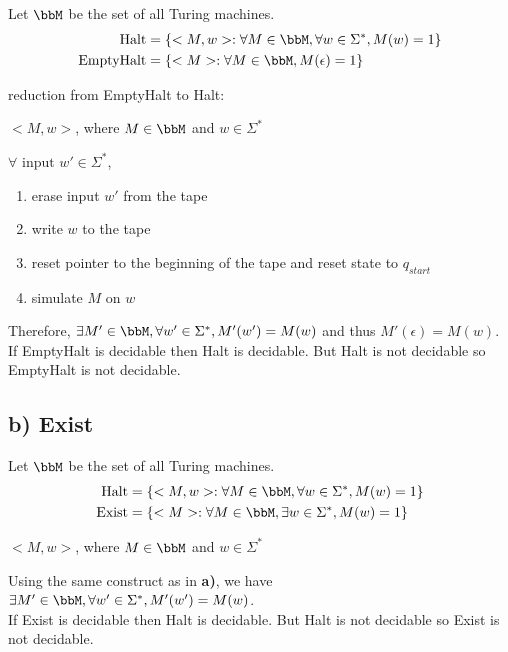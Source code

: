 \documentclass[twoside,11pt]{homework}
\begin{document}
\begin{solution}
  Let $\bbM$ be the set of all Turing machines. \\
  \[
    \begin{aligned}
      \text{Halt} &= \{ <M, w>: \forall M \in \bbM, \forall w \in \Sigma^*, M(w) = 1\}\\
      \text{EmptyHalt} &= \{ <M> : \forall M \in \bbM, M(\epsilon) = 1 \}
    \end{aligned}
  \]

  reduction from EmptyHalt to Halt:
  \begin{given}
    $<M ,w>$, where $M \in \bbM$ and $w \in \Sigma^*$
  \end{given}
  \begin{construct}
    $\forall \text{ input } w' \in \Sigma^*$,
    \begin{enumerate}
    \item erase input $w'$ from the tape
    \item write $w$ to the tape
    \item reset pointer to the beginning of the tape and reset state to $q_{start}$
    \item simulate $M$ on $w$
    \end{enumerate}
  \end{construct}
  Therefore, $\exists M' \in \bbM, \forall w' \in \Sigma^*, M'(w') = M(w)$ and thus $ M'(\epsilon) = M(w)$.\\
  If EmptyHalt is decidable then Halt is decidable.
  But Halt is not decidable so EmptyHalt is not decidable.

\end{solution}

\subsection*{b) Exist}
  Let $\bbM$ be the set of all Turing machines. \\
  \[
    \begin{aligned}
      \text{Halt} &= \{ <M, w>: \forall M \in \bbM, \forall w \in \Sigma^*, M(w) = 1\}\\
      \text{Exist} &= \{ <M> : \forall M \in \bbM, \exists w \in \Sigma^*, M(w) = 1 \}
    \end{aligned}
  \]

  \begin{given}
    $<M ,w>$, where $M \in \bbM$ and $w \in \Sigma^*$
  \end{given}
  Using the same construct as in \textbf{a)},
  we have $\exists M' \in \bbM, \forall w' \in \Sigma^*, M'(w') = M(w)$.\\
  If Exist is decidable then Halt is decidable.
  But Halt is not decidable so Exist is not decidable.
\end{document}
